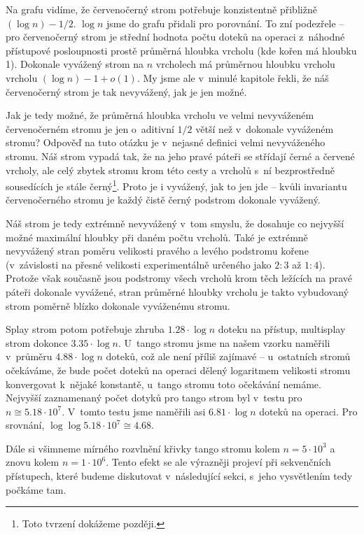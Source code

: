 Na grafu vidíme, že červenočerný strom potřebuje konzistentně přibližně $(\log
n) - 1/2$. $\log n$ jsme do grafu přidali pro porovnání. To zní podezřele --
pro červenočerný strom je střední hodnota počtu doteků na operaci z~náhodné
přístupové posloupnosti prostě průměrná hloubka vrcholu (kde kořen má hloubku
1). Dokonale vyvážený strom na $n$ vrcholech má průměrnou hloubku vrcholu
vrcholu $(\log n) - 1 + o(1)$. My jsme ale v~minulé kapitole řekli, že náš
červenočerný strom je tak nevyvážený, jak je jen možné.

Jak je tedy možné, že průměrná hloubka vrcholu ve velmi nevyváženém
červenočerném stromu je jen o~aditivní $1/2$ větší než v~dokonale vyváženém
stromu? Odpověď na tuto otázku je v~nejasné definici velmi nevyváženého stromu.
Náš strom vypadá tak, že na jeho pravé páteři se střídají černé a červené
vrcholy, ale celý zbytek stromu krom této cesty a vrcholů s~ní bezprostředně
sousedících je stále černý\footnote{Toto tvrzení dokážeme později.}. Proto je i vyvážený, jak to jen jde -- kvůli
invariantu červenočerného stromu je každý čistě černý podstrom dokonale
vyvážený.

Náš strom je
tedy extrémně nevyvážený v~tom smyslu, že dosahuje co nejvyšší možné maximální
hloubky při daném počtu vrcholů. Také je extrémně nevyvážený stran poměru
velikosti pravého a levého podstromu kořene (v~závislosti na přesné velikosti
experimentálně určeného jako $2:3$ až $1:4$). Protože však současně jsou
podstromy všech vrcholů krom těch ležících na pravé páteři dokonale
vyvážené, stran průměrné hloubky vrcholu je takto vybudovaný strom poměrně
blízko dokonale vyváženému stromu.


Splay strom potom potřebuje zhruba $1.28\cdot \log n$ doteku na přístup, multisplay strom
dokonce $3.35\cdot \log n$. U~tango stromu jsme na našem vzorku naměřili
v~průměru $4.88\cdot \log n$ doteků, což ale není příliš zajímavé -- u~ostatních
stromů očekáváme, že bude počet doteků na operaci dělený logaritmem velikosti stromu konvergovat
k~nějaké konstantě, u~tango stromu toto očekávání nemáme. Nejvyšší zaznamenaný
počet dotyků pro tango strom byl v~testu pro $n \cong 5.18\cdot 10^7$. V~tomto
testu jsme naměřili asi $6.81\cdot \log n$ doteků na operaci. Pro srovnání,
$\log\log 5.18\cdot 10^7 \cong 4.68$. 

Dále si všimneme mírného rozvlnění křivky tango stromu kolem $n=5\cdot 10^3$ a
znovu kolem $n=1\cdot 10^6$. Tento efekt se ale výrazněji projeví při
sekvenčních přístupech, které budeme diskutovat v~následující sekci, s~jeho
vysvětlením tedy počkáme tam.

